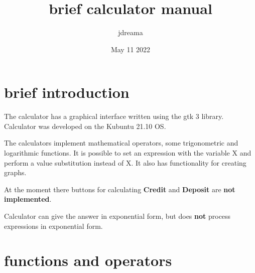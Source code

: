 \documentclass[12pt, a4paper]{article}
\title{brief calculator manual}
\author{jdreama}
\date{May 11 2022}
\begin{document}
\maketitle

\pagebreak

\tableofcontents

\pagebreak

\section{brief introduction}





The calculator has a graphical interface written using the gtk 3 library.
Calculator was developed on the Kubuntu 21.10 OS.

The calculators implement mathematical operators, some trigonometric and logarithmic functions. It is possible to set an expression with the variable X and perform a value substitution instead of X. It also has functionality for creating graphs.

At the moment there buttons for calculating \textbf{Credit} and \textbf{Deposit} are \textbf{not implemented}.

Calculator can give the answer in exponential form, but does \textbf{not} process expressions in exponential form.

\pagebreak

\section{functions and operators}
\end{document}
